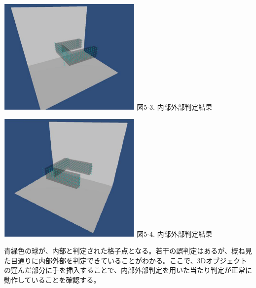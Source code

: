  \vspace{5mm}
\begin{minipage}{0.5\hsize}
  \begin{center}
   \includegraphics[width=70mm]{IED3D_2.eps}
   図5-3. 内部外部判定結果
  \end{center}
  \label{fig:one}
 \end{minipage}
 \begin{minipage}{0.5\hsize}
  \begin{center}
   \includegraphics[width=70mm]{IED3D_1.eps}
   図5-4. 内部外部判定結果
  \end{center}
  \label{fig:two}
 \end{minipage}

青緑色の球が、内部と判定された格子点となる。若干の誤判定はあるが、概ね見た目通りに内部外部を判定できていることがわかる。ここで、3Dオブジェクトの窪んだ部分に手を挿入することで、内部外部判定を用いた当たり判定が正常に動作していることを確認する。

